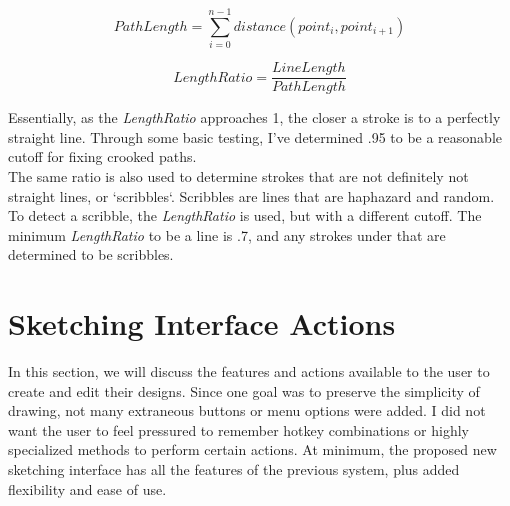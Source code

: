 \begin{equation}
\label{equ:ratio2}
PathLength = \sum_{i=0}^{n-1} distance(point_{i}, point_{i+1})
\end{equation}

\begin{equation}
\label{equ:ratio3}
LengthRatio = \dfrac{LineLength}{PathLength}
\end{equation}

Essentially, as the \textit{LengthRatio} approaches 1, the closer a stroke is to a perfectly straight line. Through some basic testing, I've determined .95 to be a reasonable cutoff for fixing crooked paths. \\

The same ratio is also used to determine strokes that are not definitely not straight lines, or `scribbles`. Scribbles are lines that are haphazard and random. To detect a scribble, the \textit{LengthRatio} is used, but with a different cutoff. The minimum \textit{LengthRatio} to be a line is .7, and any strokes under that are determined to be scribbles. 


\section{Sketching Interface Actions}

In this section, we will discuss the features and actions available to the user to create and edit their designs. Since one goal was to preserve the simplicity of drawing, not many extraneous buttons or menu options were added. I did not want the user to feel pressured to remember hotkey combinations or highly specialized methods to perform certain actions. At minimum, the proposed new sketching interface has all the features of the previous system, plus added flexibility and ease of use.

